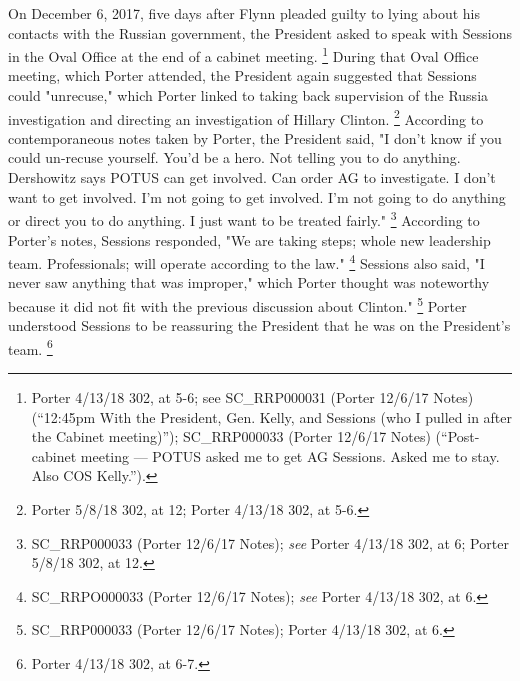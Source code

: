On December 6, 2017, five days after Flynn pleaded guilty to lying about his contacts with the Russian government, the President asked to speak with Sessions in the Oval Office at the end of a cabinet meeting.%
\footnote{Porter 4/13/18 302, at 5-6;
see SC\_RRP000031 (Porter 12/6/17 Notes) (“12:45pm With the President, Gen. Kelly, and Sessions (who I pulled in after the Cabinet meeting)”);
SC\_RRP000033 (Porter 12/6/17 Notes) (“Post-cabinet meeting — POTUS asked me to get AG Sessions.
Asked me to stay.
Also COS Kelly.”).}
During that Oval Office meeting, which Porter attended, the President again suggested that Sessions could "unrecuse," which Porter linked to taking back supervision of the Russia investigation and directing an investigation of Hillary Clinton.%
\footnote{Porter 5/8/18 302, at 12;
Porter 4/13/18 302, at 5-6.}
According to contemporaneous notes taken by Porter, the President said, "I don't know if you could un-recuse yourself.
You'd be a hero.
Not telling you to do anything.
Dershowitz says POTUS can get involved.
Can order AG to investigate.
I don't want to get involved.
I'm not going to get involved.
I'm not going to do anything or direct you to do anything.
I just want to be treated fairly."%
\footnote{SC\_RRP000033 (Porter 12/6/17 Notes);
\textit{see} Porter 4/13/18 302, at 6;
Porter 5/8/18 302, at 12.}
According to Porter's notes, Sessions responded, "We are taking steps; whole new leadership team.
Professionals; will operate according to the law."%
\footnote{SC\_RRPO000033 (Porter 12/6/17 Notes);
\textit{see} Porter 4/13/18 302, at 6.}
Sessions also said, "I never saw anything that was improper," which Porter thought was noteworthy because it did not fit with the previous discussion about Clinton."%
\footnote{SC\_RRP000033 (Porter 12/6/17 Notes);
Porter 4/13/18 302, at 6.}
Porter understood Sessions to be reassuring the President that he was on the President's team.%
\footnote{Porter 4/13/18 302, at 6-7.}

